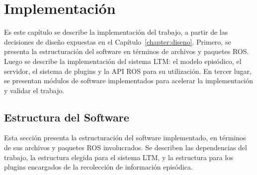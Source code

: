 \chapter{Implementación}\label{chapter:implementacion}

Es este capítulo se describe la implementación del trabajo, a partir de las decisiones de diseño expuestas en el Capítulo~\ref{chapter:diseno}. Primero, se presenta la estructuración del software en términos de archivos y paquetes ROS. Luego se describe la implementación del sistema LTM: el modelo episódico, el servidor, el sistema de plugins y la API ROS para su utilización. En tercer lugar, se presentan módulos de software implementados para acelerar la implementación y validar el trabajo.




\section{Estructura del Software}

Esta sección presenta la estructuración del software implementado, en términos de sus archivos y paquetes ROS involucrados. Se describen las dependencias del trabajo, la estructura elegida para el sistema LTM, y la estructura para los plugins encargados de la recolección de información episódica.

